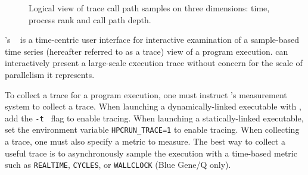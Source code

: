 


\newcommand{\crosshair}{crosshair}
\newcommand{\traceview}{Trace View}
\newcommand{\depthview}{Depth View}
\newcommand{\summaryview}{Summary View}
\newcommand{\miniview}{Mini Map View}
\newcommand{\callview}{Call Path View}




\begin{figure}[t]
\caption{Logical view of trace call path samples on three dimensions: time, process rank and call path depth.}
\label{fig:hpctraceviewer-callpath}
\end{figure}

\HPCToolkit{}'s \hpctraceviewer{}~\cite{Tallent-MC-etal:2011:ICS-hpctoolkit-scalable-tracing} is a time-centric user interface for interactive examination of a sample-based time series (hereafter referred to as a trace) view of a program execution.
 \hpctraceviewer{} can interactively present a large-scale execution trace without concern for the scale of parallelism it represents.

To collect a trace for a program execution, one must instruct \HPCToolkit{}'s measurement system to collect a trace. 
When launching a dynamically-linked executable with \hpcrun{}, add the {\tt -t } flag to enable tracing. 
When launching a statically-linked executable, set the environment variable \verb|HPCRUN_TRACE=1| to enable tracing. 
When collecting a trace, one must also specify a metric to measure.  The best way to collect a useful trace is to asynchronously sample the execution with a time-based metric such as {\tt REALTIME}, {\tt CYCLES}, or {\tt WALLCLOCK} (Blue Gene/Q only).

